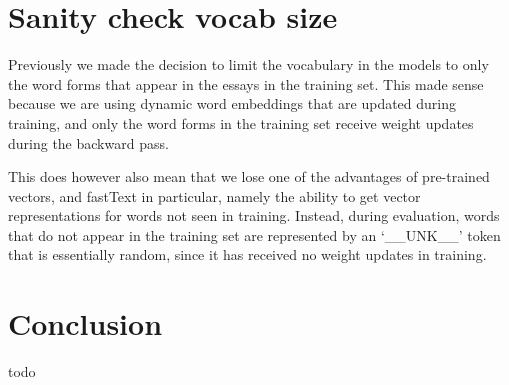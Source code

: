 \section{Sanity check vocab size}

Previously we made the decision to limit the vocabulary in the models to only
the word forms that appear in the essays in the training set. This made sense
because we are using dynamic word embeddings that are updated during
training, and only the word forms in the training set receive weight updates
during the backward pass.

This does however also mean that we lose one of the advantages of pre-trained
vectors, and fastText in particular, namely the ability to get vector
representations for words not seen in training. Instead, during evaluation,
words that do not appear in the training set are represented by an
`\_\_UNK\_\_' token that is essentially random, since it has received no
weight updates in training.


\section{Conclusion}

todo

